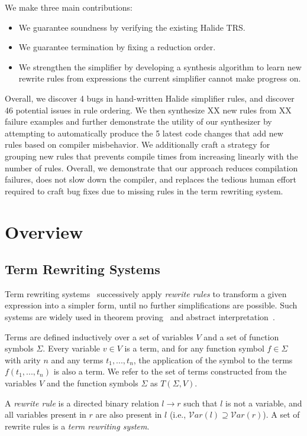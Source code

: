 \documentclass[sigplan,10pt,review,anonymous]{acmart}\settopmatter{printfolios=true,printccs=false,printacmref=false}
\newcommand{\NumRulesFixed}{{\color{red} 4}\xspace}
\newcommand{\NumOrderingProblems}{{\color{red} 46}\xspace}
\newcommand{\NumRulesSynthesized}{{\color{red} XX}\xspace}
\newcommand{\NumFailureExamples}{{\color{red} XX}\xspace}
\newcommand{\NumBugsAutomated}{{\color{red} 5}\xspace}
\begin{document}
We make three main contributions:
\begin{itemize}
  \item We guarantee soundness by verifying the existing Halide TRS.
  \item We guarantee termination by fixing a reduction order.
  \item We strengthen the simplifier by developing a synthesis algorithm to learn new rewrite rules from expressions the current simplifier cannot make progress on.
\end{itemize}

Overall, we discover \NumRulesFixed bugs in hand-written Halide simplifier rules, and discover \NumOrderingProblems
potential issues in rule ordering.  We then synthesize \NumRulesSynthesized new rules from \NumFailureExamples
failure examples and further demonstrate the utility of our synthesizer by attempting to
automatically produce the \NumBugsAutomated latest code changes that add new
rules based on compiler misbehavior. We additionally craft a strategy for grouping
new rules that prevents compile times from increasing linearly with the number
of rules.  Overall, we demonstrate that our approach
reduces compilation failures, does not slow down the compiler, and replaces the
tedious human effort required to craft bug fixes due to missing rules in the
term rewriting system.

\section{Overview}
\subsection{Term Rewriting Systems}
Term rewriting systems~\cite{gorn1967} successively apply \textit{rewrite rules} to transform a given
expression into a simpler form, until no further simplifications are possible.  Such systems are widely
used in theorem proving~\cite{} and abstract interpretation~\cite{}.

Terms are defined inductively over a set of variables $V$ and a set of function symbols $\Sigma$. Every variable $v \in V$ is a term, and for any function symbol $f \in \Sigma$ with arity $n$ and any terms $t_1, ..., t_n$, the application of the symbol to the terms $f(t_1, ..., t_n)$ is also a term. We refer to the set of terms constructed from the variables $V$ and the function symbols $\Sigma$ as $T(\Sigma, V)$.

A \emph{rewrite rule} is a directed binary relation $l \rightarrow r$ such that $l$ is not a variable, and all variables present in $r$ are also present in $l$ (i.e., $\mathcal{V}ar(l) \supseteq \mathcal{V}ar(r)$). A set of rewrite rules is a \emph{term rewriting system}.
\end{document}
